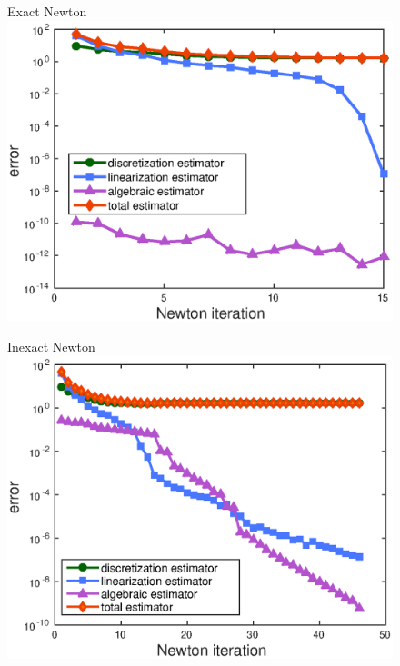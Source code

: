 \documentclass[10 pt]{beamer}
\begin{document}
\begin{frame}
\begin{figure}
   \begin{minipage}[c]{.33\linewidth}
   \centering
   Exact  Newton 
\includegraphics[width=\textwidth]{fig_article/estimators_newton_step_exact_resolution_bis.eps}    
   \end{minipage} \hfill
   \begin{minipage}[c]{.33\linewidth}
   \centering
   Inexact Newton
\includegraphics[width=\textwidth]{fig_article/estimators_newton_step_inexact_resolution.eps}     
   \end{minipage} \hfill
  \begin{minipage}[c]{.32\linewidth}

\end{minipage}
\end{figure}
\end{frame}
\end{document}
